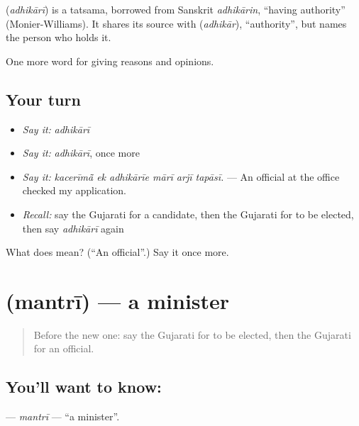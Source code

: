 \begin{cousinweb}
\textbf{} (\emph{adhikārī}) is a tatsama, borrowed from Sanskrit \emph{adhikārin}, \textquotedblleft{}having authority\textquotedblright{} (Monier-Williams). It shares its source with \textbf{} (\emph{adhikār}), \textquotedblleft{}authority\textquotedblright{}, but names the person who holds it.
\end{cousinweb}

\begin{grammarlens}[title={What you've built}]
One more word for giving reasons and opinions.
\end{grammarlens}

\subsection*{Your turn}
\begin{itemize}
\raggedright
  \item \emph{Say it:} \emph{adhikārī}
  \item \emph{Say it:} \emph{adhikārī}, once more
  \item \emph{Say it:} \emph{kacerīmā̃ ek adhikārīe mārī arjī tapāsī.} — An official at the office checked my application.
  \item \emph{Recall:} say the Gujarati for a candidate, then the Gujarati for to be elected, then say \emph{adhikārī} again
\end{itemize}

\begin{tcolorbox}[breakable,colback=teal!4,colframe=teal!35!black,title={Before you move on}]
What does  mean? (\textquotedblleft{}An official\textquotedblright{}.) Say it once more.
\end{tcolorbox}
\section[\texorpdfstring{\gu{મંત્રી} (mantrī)}{મંત્રી (mantrī)}]{ (mantrī) — a minister}

\label{lesson:GU-C354-mantri}



\begin{quote}
Before the new one: say the Gujarati for to be elected, then the Gujarati for an official.
\end{quote}

\subsection*{You'll want to know: }
\textbf{} — \emph{mantrī} — \textquotedblleft{}a minister\textquotedblright{}.

